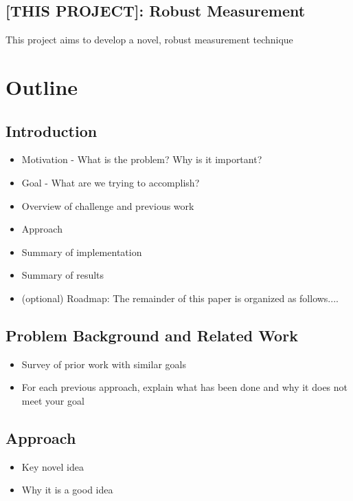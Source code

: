 \documentclass[pageno]{jpaper}
\begin{document}
\subsection{[THIS PROJECT]: Robust Measurement}
This project aims to develop a novel, robust measurement technique 

\section{Outline}  

\subsection{Introduction}
\begin{itemize}
	\item Motivation - What is the problem? Why is it important?
	\item Goal - What are we trying to accomplish?
	\item Overview of challenge and previous work 
	\item Approach 
	\item Summary of implementation
	\item Summary of results
	\item (optional) Roadmap: The remainder of this paper is organized as follows....
\end{itemize}

\subsection{Problem Background and Related Work}
\begin{itemize}
	\item Survey of prior work with similar goals 
	\item For each previous approach, explain what has been done and why it does not meet your goal
\end{itemize}

\subsection{Approach}
\begin{itemize}
	\item Key novel idea
	\item Why it is a good idea
\end{itemize}
\end{document}
